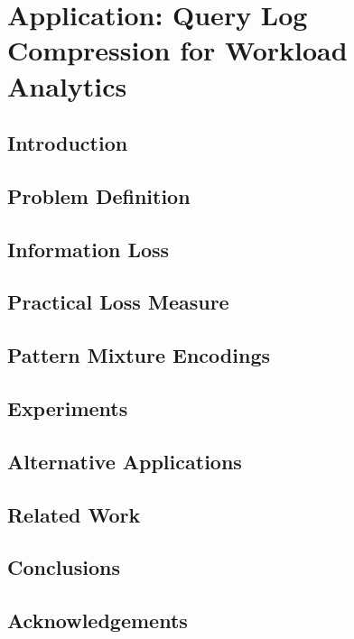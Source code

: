 \chapter{Application: Query Log Compression for Workload Analytics}

\section{Introduction}


\section{Problem Definition}
\label{sec:problemdefinition}


\section{Information Loss}
\label{sec:analyzingsummaries}


\section{Practical Loss Measure}
\label{sec:practicalrepresentativeness}


\section{Pattern Mixture Encodings}


\section{Experiments}
\label{sec:experiments}


\section{Alternative Applications}
\label{sec:evaluatingalternativeapplications}


\section{Related Work}
\label{sec:backgroundandrelatedwork}


\section{Conclusions}
\label{sec:conclusion}


\balance

\section{Acknowledgements}

